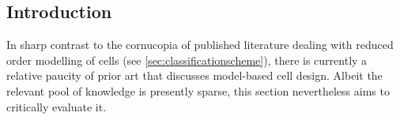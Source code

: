 



\subsection{Introduction}

In  sharp  contrast to  the  cornucopia  of  published literature  dealing  with
reduced order modelling of cells (see \cref{sec:classificationscheme}), there is
currently  a relative  paucity  of  prior art  that  discusses model-based  cell
design. Albeit the relevant pool of  knowledge is presently sparse, this section
nevertheless aims to critically evaluate it.

